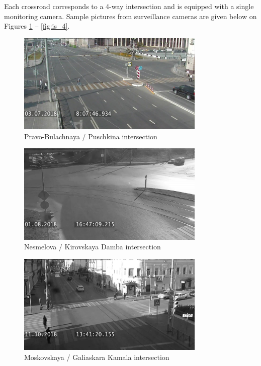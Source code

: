Each crossroad corresponds to a 4-way intersection and is equipped with a single monitoring camera. Sample pictures from surveillance cameras are given below on Figures \ref{fig:is_1} -- \ref{fig:is_4}.
\begin{figure}[!htb]
	\centering{}
	\includegraphics[width=0.8\textwidth]{images/is-1.jpg}
	\caption{Pravo-Bulachnaya / Puschkina intersection}
	\label{fig:is_1}
\end{figure}
\begin{figure}[!htb]
	\centering{}
	\includegraphics[width=0.8\textwidth]{images/is-2.jpg}
	\caption{Nesmelova / Kirovskaya Damba intersection}
	\label{fig:is_2}
\end{figure}
\begin{figure}[!htb]
	\centering{}
	\includegraphics[width=0.8\textwidth]{images/is-3.jpg}	\caption{Moskovskaya / Galiaskara Kamala intersection}
	\label{fig:is_3}
\end{figure}
